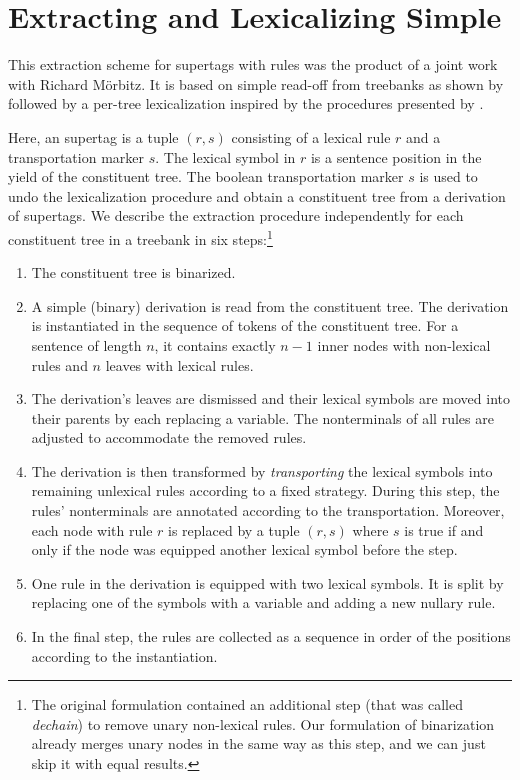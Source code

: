 \documentclass[../../document.tex]{subfiles}
\begin{document}
    \section{Extracting and Lexicalizing Simple } \label{sec:extraction:readoff}
    This extraction scheme for supertags with  rules was the product of a joint work with Richard Mörbitz. \citep{MoeRup20,RupMoe21}
    It is based on simple  read-off from treebanks as shown by \citet{KalMai13} followed by a per-tree lexicalization inspired by the procedures presented by \citet{EngMalMan18}.

    Here, an  supertag is a tuple \((r, s)\) consisting of a lexical rule \(r\) and a transportation marker \(s\).
    The lexical symbol in \(r\) is a sentence position in the yield of the constituent tree.
    The boolean transportation marker \(s\) is used to undo the lexicalization procedure and obtain a constituent tree from a derivation of supertags.
    We describe the extraction procedure independently for each constituent tree in a treebank in six steps:\footnote{
        The original formulation contained an additional step (that was called \emph{dechain}) to remove unary non-lexical rules.
        Our formulation of binarization already merges unary nodes in the same way as this step, and we can just skip it with equal results.
    }
    \begin{enumerate}
        \item The constituent tree is binarized.
        \item
            A simple (binary)  derivation is read from the constituent tree.
            The derivation is instantiated in the sequence of tokens of the constituent tree.
            For a sentence of length \(n\), it contains exactly \(n-1\) inner nodes with non-lexical rules and \(n\) leaves with lexical rules.
        \item\label{enum:lcfrs:step1}
            The derivation's leaves are dismissed and their lexical symbols are moved into their parents by each replacing a variable.
            The  nonterminals of all rules are adjusted to accommodate the removed rules.
        \item\label{enum:lcfrs:step2}
            The derivation is then transformed by \emph{transporting} the lexical symbols into remaining unlexical rules according to a fixed strategy.
            During this step, the rules'  nonterminals are annotated according to the transportation.
            Moreover, each node with rule \(r\) is replaced by a tuple \((r, s)\) where \(s\) is true if and only if the node was equipped another lexical symbol before the step.
        \item\label{enum:lcfrs:step3}
            One rule in the derivation is equipped with two lexical symbols.
            It is split by replacing one of the symbols with a variable and adding a new nullary rule.
        \item
            In the final step, the rules are collected as a sequence in order of the positions according to the instantiation.
    \end{enumerate}
\end{document}
